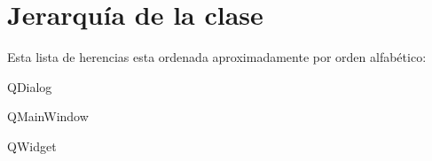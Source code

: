 \section{Jerarquía de la clase}
Esta lista de herencias esta ordenada aproximadamente por orden alfabético\-:\begin{DoxyCompactList}
\item {}
\item Q\-Dialog\begin{DoxyCompactList}
\item {}
\item {}
\item {}
\end{DoxyCompactList}
\item Q\-Main\-Window\begin{DoxyCompactList}
\item {}
\item {}
\end{DoxyCompactList}
\item Q\-Widget\begin{DoxyCompactList}
\item {}
\end{DoxyCompactList}
\end{DoxyCompactList}
